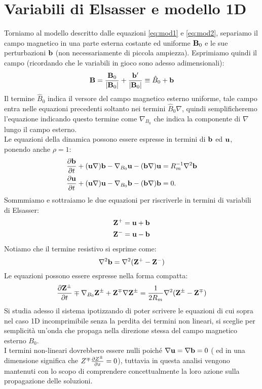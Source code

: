 \section{Variabili di Elsasser e modello 1D}
Torniamo al modello descritto dalle equazioni \ref{eq:mod1} e \ref{eq:mod2}, separiamo il campo magnetico in una parte esterna costante ed uniforme $\vv{B}_0$ e le sue perturbazioni $\vv{b}$ (non necessariamente di piccola ampiezza). Esprimiamo quindi il campo (ricordando che le variabili in gioco sono adesso adimensionali): 
\[
    \vv{B} = \frac{\vv{B}_0}{\left|\vv{B}_0\right|} + \frac{\vv{b'}}{\left|\vv{B}_0\right|} \equiv \hat{B}_0 + \vv{b}
\]
Il termine $\hat{B}_0$ indica il versore del campo magnetico esterno uniforme, tale campo entra nelle equazioni precedenti soltanto nei termini $\hat{B}_0 \nabla$, quindi semplificheremo l'equazione indicando questo termine come $\nabla_{B_0}$ che indica la componente di $\nabla$ lungo il campo esterno.\\
Le equazioni della dinamica possono essere espresse in termini di $\vv{b}$ ed $\vv{u}$, ponendo anche $\rho = 1$:
\begin{align}
     & \pd{\vv{b}}  + (\vv{u}\nabla) \vv{b} - \nabla_{B_0} \vv{u} - (\vv{b} \nabla) \vv{u} = R_m^{-1} \nabla^2 \vv{b} \\
     & \pd{\vv{u}}  + (\vv{u}\nabla) \vv{u} - \nabla_{B_0} \vv{b} - (\vv{b} \nabla) \vv{b} = 0. 
\end{align}
Sommmiamo e sottraiamo le due equazioni per riscriverle in termini di variabili di Elsasser:
\begin{align*}
    &\vv{Z}^+ = \vv{u} + \vv{b} \\
    &\vv{Z}^- = \vv{u} - \vv{b} 
\end{align*}
Notiamo che il termine resistivo si esprime come:
\[
    \nabla^2 \vv{b} = \nabla^2 (\vv{Z}^+ - \vv{Z}^-)
\]
Le equazioni possono essere espresse nella forma compatta:
\[
    \pd{\vv{Z}^{\pm}} \mp \nabla_{B_0} \vv{Z}^{\pm} + \vv{Z}^{\mp} \nabla \vv{Z}^{\pm} = \frac{1}{2R_m} \nabla^2 (\vv{Z}^{\pm} - \vv{Z}^{\mp})
\]
Si studia adesso il sistema ipotizzando di poter scrivere le equazioni di cui sopra nel caso 1D incomprimibile senza la perdita dei termini non lineari, si sceglie per semplicità un'onda che propaga nella direzione stessa del campo magnetico esterno $B_0$.\\
I termini non-lineari dovrebbero essere nulli poiché $\nabla \vv{u} = \nabla \vv{b} = 0$ ( ed in una dimensione significa che $Z^{\mp} \frac{\partial Z^{\pm}}{\partial x} = 0$), tuttavia in questa analisi vengono mantenuti con lo scopo di comprendere concettualmente la loro azione sulla propagazione delle soluzioni. \\

